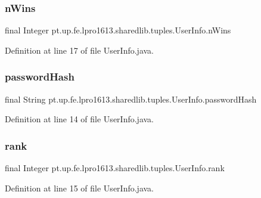\subsubsection{\texorpdfstring{n\+Wins}{nWins}}
{\footnotesize\ttfamily final Integer pt.\+up.\+fe.\+lpro1613.\+sharedlib.\+tuples.\+User\+Info.\+n\+Wins}



Definition at line 17 of file User\+Info.\+java.

\hypertarget{classpt_1_1up_1_1fe_1_1lpro1613_1_1sharedlib_1_1tuples_1_1_user_info_a7b87b5f23fd1b1d43f535543dccfeedf}{}\label{classpt_1_1up_1_1fe_1_1lpro1613_1_1sharedlib_1_1tuples_1_1_user_info_a7b87b5f23fd1b1d43f535543dccfeedf} 
\subsubsection{\texorpdfstring{password\+Hash}{passwordHash}}
{\footnotesize\ttfamily final String pt.\+up.\+fe.\+lpro1613.\+sharedlib.\+tuples.\+User\+Info.\+password\+Hash}



Definition at line 14 of file User\+Info.\+java.

\hypertarget{classpt_1_1up_1_1fe_1_1lpro1613_1_1sharedlib_1_1tuples_1_1_user_info_a05c2d0e090c34511a8fc358eea1eb50d}{}\label{classpt_1_1up_1_1fe_1_1lpro1613_1_1sharedlib_1_1tuples_1_1_user_info_a05c2d0e090c34511a8fc358eea1eb50d} 
\subsubsection{\texorpdfstring{rank}{rank}}
{\footnotesize\ttfamily final Integer pt.\+up.\+fe.\+lpro1613.\+sharedlib.\+tuples.\+User\+Info.\+rank}



Definition at line 15 of file User\+Info.\+java.

\hypertarget{classpt_1_1up_1_1fe_1_1lpro1613_1_1sharedlib_1_1tuples_1_1_user_info_a80e19822b28fa3b58eb7a5cb17363899}{}\label{classpt_1_1up_1_1fe_1_1lpro1613_1_1sharedlib_1_1tuples_1_1_user_info_a80e19822b28fa3b58eb7a5cb17363899} 
